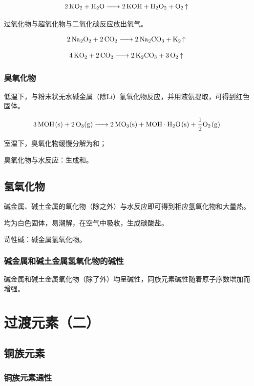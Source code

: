 \documentclass[a4paper,UTF8]{article}
\begin{document}
$$ \ce{2KO2 + H2O -> 2KOH + H2O2 + O2\ce{^}} $$

过氧化物与超氧化物与二氧化碳反应放出氧气。

$$ \ce{2Na2O2 + 2CO2 -> 2Na2CO3 + K2\ce{^}} $$

$$ \ce{4KO2 + 2CO2 -> 2K2CO3 + 3O2\ce{^}} $$

\subsubsection{臭氧化物}

低温下，与粉末状无水碱金属（除Li）氢氧化物反应，并用液氨提取，可得到红色固体。

$$ \ce{3MOH(s) + 2O3(g) -> 2MO3(s) + MOH\cdot H2O(s) + \frac{1}{2}O2(g)} $$

室温下，臭氧化物缓慢分解为和；

臭氧化物与水反应：生成和。

\subsection{氢氧化物}

碱金属、碱土金属的氧化物（除之外）与水反应即可得到相应氢氧化物和大量热。

均为白色固体，易潮解，在空气中吸收，生成碳酸盐。

苛性碱：碱金属氢氧化物。

\subsubsection{碱金属和碱土金属氢氧化物的碱性}

碱金属和碱土金属氧化物（除了外）均呈碱性，同族元素碱性随着原子序数增加而增强。




\section{过渡元素（二）}

\subsection{铜族元素}

\subsubsection{铜族元素通性}
\end{document}
